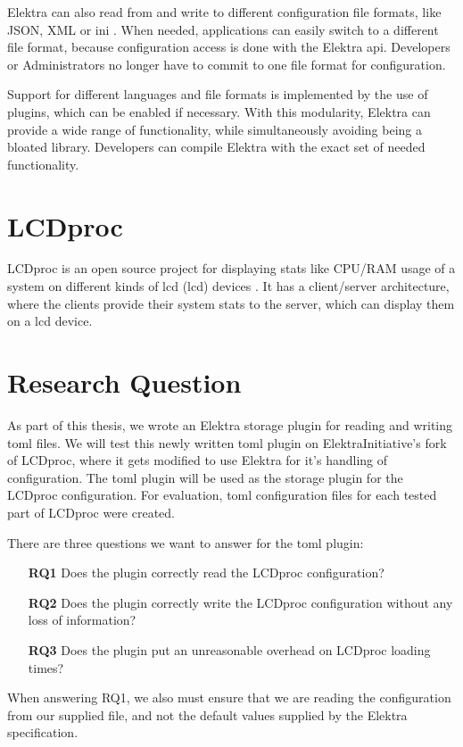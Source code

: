 \documentclass[draft,final]{vutinfth} %
\begin{document}
Elektra can also read from and write to different configuration file formats, like JSON, XML or ini \cite{elektrastorage}.
When needed, applications can easily switch to a different file format, because configuration access is done with the Elektra \acrshort{api}.
Developers or Administrators no longer have to commit to one file format for configuration.

Support for different languages and file formats is implemented by the use of plugins, which can be enabled if necessary.
With this modularity, Elektra can provide a wide range of functionality, while simultaneously avoiding being a bloated library.
Developers can compile Elektra with the exact set of needed functionality.

\section{LCDproc}
LCDproc is an open source project for displaying stats like CPU/RAM usage of a system on different kinds of \acrshort{lcd} (\acrlong{lcd}) devices \cite{lcdprocmain}\cite{lcdprocgit}.
It has a client/server architecture, where the clients provide their system stats to the server, which can display them on a \acrshort{lcd} device.

\section{Research Question}
As part of this thesis, we wrote an Elektra storage plugin for reading and writing \acrshort{toml} files.
We will test this newly written \acrshort{toml} plugin on ElektraInitiative's fork of LCDproc, where it gets modified to use Elektra for it's handling of configuration.
The \acrshort{toml} plugin will be used as the storage plugin for the LCDproc configuration.
For evaluation, \acrshort{toml} configuration files for each tested part of LCDproc were created.

There are three questions we want to answer for the \acrshort{toml} plugin:
\begin{itemize}
	\item[\textbf{RQ1}] Does the plugin correctly read the LCDproc configuration?
	\item[\textbf{RQ2}] Does the plugin correctly write the LCDproc configuration without any loss of information?
	\item[\textbf{RQ3}] Does the plugin put an unreasonable overhead on LCDproc loading times?
\end{itemize}
When answering RQ1, we also must ensure that we are reading the configuration from our supplied file, and not the default values supplied by the Elektra specification.
\end{document}
